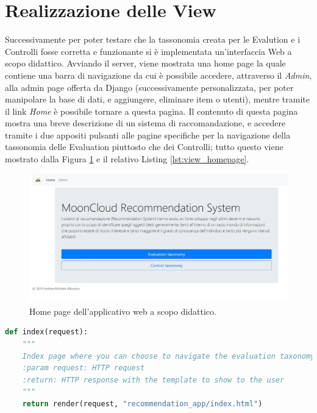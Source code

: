 \section*{Realizzazione delle View}
Successivamente per poter testare che la tassonomia creata per le Evalution e i Controlli fosse corretta e funzionante si è 
implementata un'interfaccia Web a scopo didattico.
Avviando il server, viene mostrata una home page la quale contiene una barra di navigazione da cui è possibile accedere,
attraverso il \textit{Admin}, alla admin page offerta da Django (successivamente personalizzata, per poter manipolare la base di dati, 
e aggiungere, eliminare item o utenti), mentre tramite il link \textit{Home} è possibile tornare a 
questa pagina. Il contenuto di questa pagina mostra una breve descrizione di un sistema di raccomandazione, e accedere tramite i due 
appositi pulsanti alle pagine specifiche per la navigazione della tassonomia delle Evaluation piuttosto che dei Controlli; tutto questo 
viene mostrato dalla Figura \ref{fig:MCRS_homepage} e il relativo Listing \ref{lst:view_homepage}.
%
\begin{figure}[ht!]
    \includegraphics[scale=0.4]{images/MCRS_homepage.jpg}
    \caption[Home page dell'applicativo web a scopo didattico]{Home page dell'applicativo web a scopo didattico.}
    \label{fig:MCRS_homepage}
\end{figure}
\lstset{style=python_code_style}
\begin{lstlisting}[language=Python, label=lst:view_homepage, caption={Parte principale del codice delle View della soluzione per gestire l'accesso 
    alla home page.}]
def index(request):
    """
    Index page where you can choose to navigate the evaluation taxonomy or the control taxonomy.
    :param request: HTTP request
    :return: HTTP response with the template to show to the user
    """
    return render(request, "recommendation_app/index.html")
\end{lstlisting}
